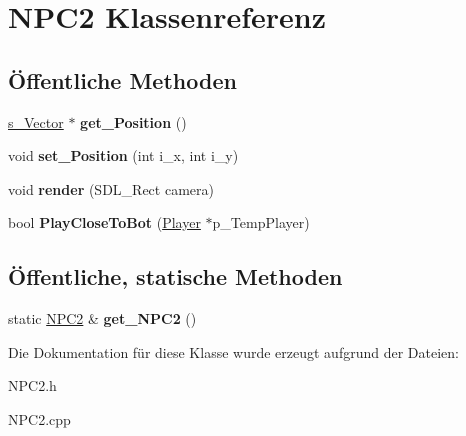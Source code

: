 \hypertarget{class_n_p_c2}{\section{N\-P\-C2 Klassenreferenz}
\label{class_n_p_c2}
}
\subsection*{Öffentliche Methoden}
\begin{DoxyCompactItemize}
\item 
\hypertarget{class_n_p_c2_a8dbd0f944b51a7d6acb0f4faf3f7eb92}{\hyperlink{structs___vector}{s\-\_\-\-Vector} $\ast$ {\bfseries get\-\_\-\-Position} ()}\label{class_n_p_c2_a8dbd0f944b51a7d6acb0f4faf3f7eb92}

\item 
\hypertarget{class_n_p_c2_a77cbb553e517b11026e95cf7f0ada3d6}{void {\bfseries set\-\_\-\-Position} (int i\-\_\-x, int i\-\_\-y)}\label{class_n_p_c2_a77cbb553e517b11026e95cf7f0ada3d6}

\item 
\hypertarget{class_n_p_c2_a5f05d6eaecaaa39e744569b453fd0c05}{void {\bfseries render} (S\-D\-L\-\_\-\-Rect camera)}\label{class_n_p_c2_a5f05d6eaecaaa39e744569b453fd0c05}

\item 
\hypertarget{class_n_p_c2_abd040a952f1ca623263fb4981d9f1897}{bool {\bfseries Play\-Close\-To\-Bot} (\hyperlink{class_player}{Player} $\ast$p\-\_\-\-Temp\-Player)}\label{class_n_p_c2_abd040a952f1ca623263fb4981d9f1897}

\end{DoxyCompactItemize}
\subsection*{Öffentliche, statische Methoden}
\begin{DoxyCompactItemize}
\item 
\hypertarget{class_n_p_c2_af885f9c5210936ba28c99d2c23971595}{static \hyperlink{class_n_p_c2}{N\-P\-C2} \& {\bfseries get\-\_\-\-N\-P\-C2} ()}\label{class_n_p_c2_af885f9c5210936ba28c99d2c23971595}

\end{DoxyCompactItemize}


Die Dokumentation für diese Klasse wurde erzeugt aufgrund der Dateien\-:\begin{DoxyCompactItemize}
\item 
N\-P\-C2.\-h\item 
N\-P\-C2.\-cpp\end{DoxyCompactItemize}
